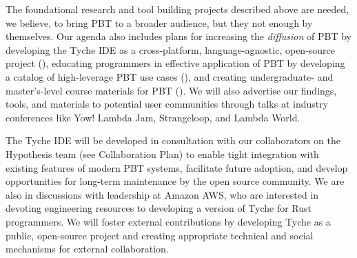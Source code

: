 {The foundational research and tool building projects described above
are needed, we believe, to bring PBT to a broader audience,
but they not enough by themselves. Our agenda also
includes plans for increasing the {\em diffusion} of PBT by developing the Tyche IDE as a
cross-platform, language-agnostic, open-source project (), educating
programmers in effective application of PBT by developing a catalog of
high-leverage PBT use cases (), and
creating undergraduate- and
master's-level course materials for PBT ().
We will also advertise our findings, tools, and materials to potential user communities
through talks at industry conferences like Yow! Lambda Jam, Strangeloop, and
Lambda World.

The Tyche IDE will be developed in consultation with
our collaborators on the Hypothesis team (see Collaboration Plan) to
enable tight integration with existing features of modern PBT systems,
facilitate future adoption, and develop opportunities for long-term maintenance
by the open source community.  We are also in discussions with
leadership at Amazon AWS, who are interested in devoting engineering
resources to developing a version of Tyche for Rust programmers.
We will foster external contributions by developing Tyche as a
public,
open-source project and creating appropriate technical and
social mechanisms for external collaboration.
%


}
